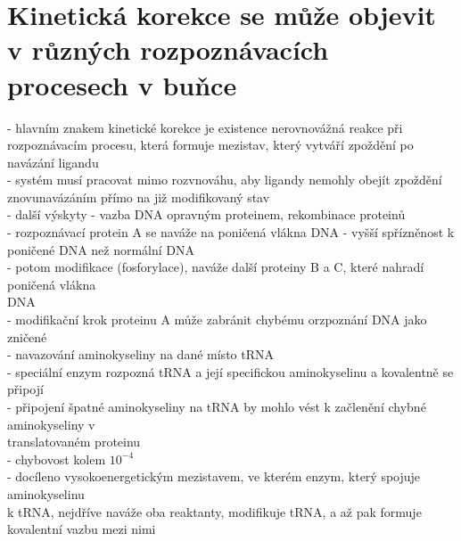 \documentclass[11pt,a4paper]{report}
\begin{document}
\section{Kinetická korekce se může objevit v různých rozpoznávacích procesech v buňce}
- hlavním znakem kinetické korekce je existence nerovnovážná reakce při rozpoznávacím procesu, která formuje mezistav, který vytváří zpoždění po navázání ligandu\\
- systém musí pracovat mimo rozvnováhu, aby ligandy nemohly obejít zpoždění znovunavázáním přímo na již modifikovaný stav\\
- další výskyty - vazba DNA opravným proteinem, rekombinace proteinů\\
- rozpoznávací protein A se naváže na poničená vlákna DNA - vyšší spřízněnost k poničené DNA než normální DNA\\
\indent - potom modifikace (fosforylace), naváže další proteiny B a C, které nahradí poničená vlákna\\
\indent \indent DNA\\
\indent - modifikační krok proteinu A může zabránit chybému orzpoznání DNA jako zničené\\
- navazování aminokyseliny na dané místo tRNA\\
\indent - speciální enzym rozpozná tRNA a její specifickou aminokyselinu a kovalentně se připojí\\
\indent - připojení špatné aminokyseliny na tRNA by mohlo vést k začlenění chybné aminokyseliny v\\
\indent \indent translatovaném proteinu\\ 
\indent - chybovost kolem $10^{-4}$\\
\indent \indent - docíleno vysokoenergetickým mezistavem, ve kterém enzym, který spojuje aminokyselinu\\
\indent \indent \indent k tRNA, nejdříve naváže oba reaktanty, modifikuje tRNA, a až pak formuje\\
\indent \indent \indent kovalentní vazbu mezi nimi\\
\end{document}
